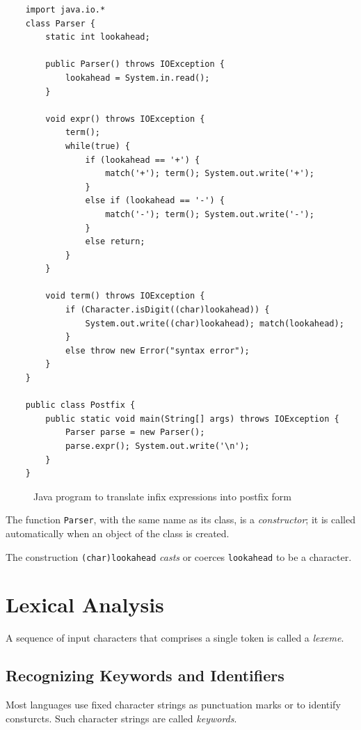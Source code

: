 \documentclass[a4paper,twoside]{book}
\begin{document}
\begin{Verbatim}
    import java.io.*
    class Parser {
        static int lookahead;

        public Parser() throws IOException {
            lookahead = System.in.read();
        }

        void expr() throws IOException {
            term();
            while(true) {
                if (lookahead == '+') {
                    match('+'); term(); System.out.write('+');
                }
                else if (lookahead == '-') {
                    match('-'); term(); System.out.write('-');
                }
                else return;
            }
        }

        void term() throws IOException {
            if (Character.isDigit((char)lookahead)) {
                System.out.write((char)lookahead); match(lookahead);
            }
            else throw new Error("syntax error");
        }
    }

    public class Postfix {
        public static void main(String[] args) throws IOException {
            Parser parse = new Parser();
            parse.expr(); System.out.write('\n');
        }
    }
\end{Verbatim}
\begin{figure}[htbp]
    \caption{Java program to translate infix expressions into postfix form}
    \label{Figure:2.27}
\end{figure}

The function \texttt{Parser}, with the same name as its class, is a \textit{constructor}; it is called automatically when an object of the class is created.

The construction \texttt{(char)lookahead} \textit{casts} or coerces \texttt{lookahead} to be a character.

\section{Lexical Analysis}

A sequence of input characters that comprises a single token is called a \textit{lexeme}.

\subsection{Recognizing Keywords and Identifiers}

Most languages use fixed character strings as punctuation marks or to identify consturcts. Such character strings are called \textit{keywords}.
\end{document}

